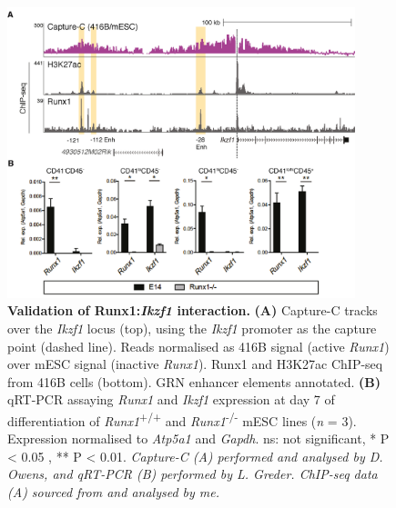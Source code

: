 \begin{figure}[!b]
    \centering
    \includegraphics[width=0.9\textwidth,height=\textheight,keepaspectratio]{figures/chapter3/ch3_runx1-ikzf1.png}
    \caption[{Validation of Runx1:\textit{Ikzf1} interaction.}]
    {\textbf{Validation of Runx1:\textit{Ikzf1} interaction.} 
    \textbf{(A)} Capture-C tracks over the \textit{Ikzf1} locus (top), using the \textit{Ikzf1} promoter as the capture point (dashed line). Reads normalised as 416B signal (active \textit{Runx1}) over mESC signal (inactive \textit{Runx1}). Runx1 and H3K27ac ChIP-seq from 416B cells (bottom). GRN enhancer elements annotated. 
    \textbf{(B)} qRT-PCR assaying \textit{Runx1} and \textit{Ikzf1} expression at day 7 of differentiation of \textit{Runx1}\textsuperscript{+/+} and \textit{Runx1}\textsuperscript{-/-} mESC lines (\textit{n} = 3). Expression normalised to \textit{Atp5a1} and \textit{Gapdh}. ns: not significant, * P < 0.05 , ** P < 0.01. 
    \textit{Capture-C (A) performed and analysed by D. Owens, and qRT-PCR (B) performed by L. Greder. ChIP-seq data (A) sourced from \cite{schutte_experimentally_2016} and analysed by me.} 
    }
    \label{fig:ch3_runx1-ikzf1}
\end{figure}

